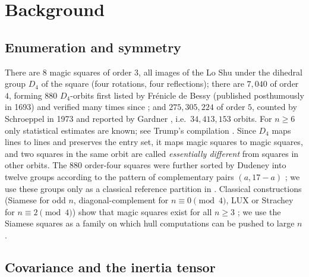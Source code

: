 \section{Background}
\label{sec:background}

\subsection{Enumeration and symmetry}

There are $8$ magic squares of order $3$, all images of the Lo Shu under the dihedral group $D_4$ of the square (four rotations, four reflections); there are $7{,}040$ of order $4$, forming $880$ $D_4$-orbits first listed by Fr\'enicle de Bessy (published posthumously in 1693) and verified many times since \cite{beck2010enumeration}; and $275{,}305{,}224$ of order $5$, counted by Schroeppel in 1973 and reported by Gardner \cite{gardner1976}, i.e.\ $34{,}413{,}153$ orbits.
For $n\ge6$ only statistical estimates are known; see Trump's compilation \cite{trump2012enumeration}.
Since $D_4$ maps lines to lines and preserves the entry set, it maps magic squares to magic squares, and two squares in the same orbit are called \emph{essentially different} from squares in other orbits.
The $880$ order-four squares were further sorted by Dudeney into twelve groups according to the pattern of complementary pairs $(a,17-a)$ \cite{dudeney1917amusements}; we use these groups only as a classical reference partition in .
Classical constructions (Siamese for odd $n$, diagonal-complement for $n\equiv0\pmod 4$, LUX or Strachey for $n\equiv2\pmod4$) show that magic squares exist for all $n\ge3$ \cite{andrews1960magic}; we use the Siamese squares as a family on which hull computations can be pushed to large $n$.

\subsection{Covariance and the inertia tensor}
\label{sec:bg_inertia}

